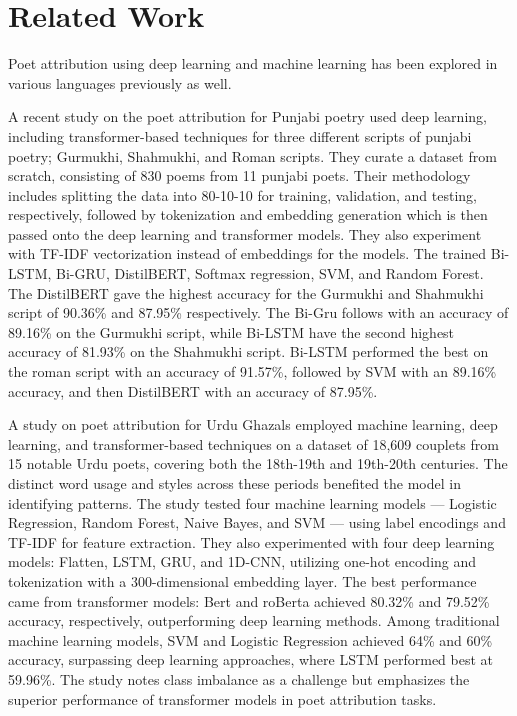 \section{Related Work}

Poet attribution using deep learning and machine learning has been explored in various languages previously as well. 

A recent study on the poet attribution for Punjabi poetry \cite{fatimarazapunjabipoetry} used deep learning, including transformer-based techniques for three different scripts of punjabi poetry; Gurmukhi, Shahmukhi, and Roman scripts. They curate a dataset from scratch, consisting of 830 poems from 11 punjabi poets. Their methodology includes splitting the data into 80-10-10 for training, validation, and testing, respectively, followed by tokenization and embedding generation which is then passed onto the deep learning and transformer models. They also experiment with TF-IDF vectorization instead of embeddings for the models. The trained Bi-LSTM, Bi-GRU, DistilBERT, Softmax regression, SVM, and Random Forest. The DistilBERT gave the highest accuracy for the Gurmukhi and Shahmukhi script of 90.36\% and 87.95\% respectively. The Bi-Gru follows with an accuracy of 89.16\% on the Gurmukhi script, while Bi-LSTM have the second highest accuracy of 81.93\% on the Shahmukhi script. Bi-LSTM performed the best on the roman script with an accuracy of 91.57\%, followed by SVM with an 89.16\% accuracy, and then DistilBERT with an accuracy of 87.95\%. 

A study on poet attribution for Urdu Ghazals \cite{fizza_iqra_urdu_attribution} employed machine learning, deep learning, and transformer-based techniques on a dataset of 18,609 couplets from 15 notable Urdu poets, covering both the 18th-19th and 19th-20th centuries. The distinct word usage and styles across these periods benefited the model in identifying patterns. The study tested four machine learning models — Logistic Regression, Random Forest, Naive Bayes, and SVM — using label encodings and TF-IDF for feature extraction. They also experimented with four deep learning models: Flatten, LSTM, GRU, and 1D-CNN, utilizing one-hot encoding and tokenization with a 300-dimensional embedding layer. The best performance came from transformer models: Bert and roBerta achieved 80.32\% and 79.52\% accuracy, respectively, outperforming deep learning methods. Among traditional machine learning models, SVM and Logistic Regression achieved 64\% and 60\% accuracy, surpassing deep learning approaches, where LSTM performed best at 59.96\%. The study notes class imbalance as a challenge but emphasizes the superior performance of transformer models in poet attribution tasks.

